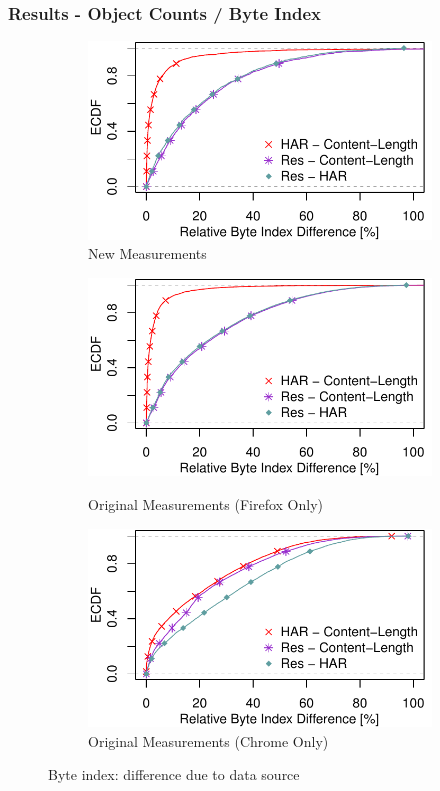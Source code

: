 \begin{frame}
    \frametitle{Results - Object Counts / Byte Index}
\begin{figure}
 \centering
 \begin{subfigure}{0.5\textwidth}
 \centering
 	 \includegraphics[width=\linewidth,keepaspectratio]{New_Plots/ecdf_rel_object_byte_index.pdf}
	\caption{New Measurements}
	\label{fig:new_relative_byte_index}

	\end{subfigure}%
	 \begin{subfigure}{0.5\textwidth}
	 \centering
	\includegraphics[width=.8\linewidth,keepaspectratio]{Firefox Plots/ecdf_rel_object_byte_index.pdf}
	\caption{Original Measurements (Firefox Only)}
	\label{fig:orig_firefox_relative_byte_index}
		\par\medskip
		\includegraphics[width=.8\linewidth,keepaspectratio]{Chrome_Plots/ecdf_rel_object_byte_index.pdf}
	\caption{Original Measurements (Chrome Only)}
	\label{fig:orig_chrome_relative_byte_index}
	\end{subfigure}
\caption{Byte index: difference due to data source}
\end{figure}

\end{frame}

